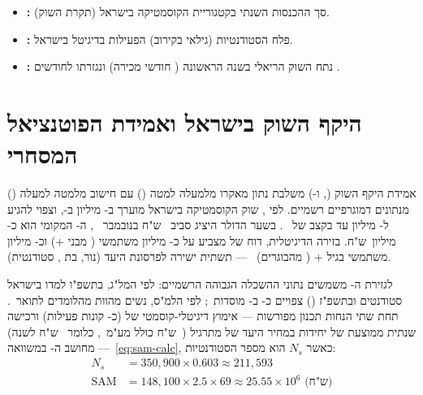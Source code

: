 \begin{definitionbox}
\begin{itemize}
  \item \textbf{:} סך ההכנסות השנתי בקטגוריית הקוסמטיקה בישראל (תקרת השוק).
  \item \textbf{:} פלח הסטודנטיות (גילאי  בקירוב) הפעילות בדיגיטל בישראל.
  \item \textbf{:} נתח השוק הריאלי בשנה הראשונה ( חודשי מכירה) ונגזרתו לחודשים .
\end{itemize}
\end{definitionbox}

\section{היקף השוק בישראל ואמידת הפוטנציאל המסחרי}
\label{sec:market-sizing}

אמידת היקף השוק (,  ו-) משלבת נתון מאקרו מלמעלה למטה
() עם חישוב מלמטה למעלה () מנתונים דמוגרפיים רשמיים.
לפי , שוק הקוסמטיקה בישראל מוערך ב- מיליון
ב-, וצפוי להגיע ל- מיליון עד  בקצב 
של ~\cite{mordor2026israel}. בשער הדולר היציג סביב ~ש"ח
בנובמבר ~\cite{boi2026rates}, ה- המקומי הוא כ-
מיליון~ש"ח. בזירה הדיגיטלית, דוח  של 
מצביע על כ- מיליון משתמשי  ( מבני +)
וכ- מיליון משתמשי  בגיל + ( מהבוגרים)~\cite{datareportal2026israel}
--- תשתית ישירה לפרסונת היעד (נור, בת , סטודנטית).

לגזירת ה- משמשים נתוני ההשכלה הגבוהה הרשמיים: לפי המל"ג, בתשפ"ו למדו
בישראל  סטודנטים ובתשפ"ז () צפויים כ-
ב- מוסדות~\cite{che2026students}; לפי הלמ"ס, נשים מהוות 
מהלומדים לתואר~\cite{cbs2024students}. תחת שתי הנחות תכנון מפורשות --- אימוץ
דיגיטלי-קוסמטי של  (כ- קונות פעילות) ורכישה שנתית ממוצעת
של  יחידות במחיר היעד של  מתרגיל  (~ש"ח כולל
 מע"מ~\cite{pwc2025israelvat}, כלומר ~ש"ח לשנה) --- מחושב
ה- במשוואה~\eqref{eq:sam-calc}, כאשר $N_s$ הוא מספר הסטודנטיות:
\begin{align}
  N_s &= 350{,}900 \times 0.603 \approx 211{,}593 \label{eq:students-calc} \\
  \text{SAM} &= 148{,}100 \times 2.5 \times 69 \approx 25.55 \times 10^6\text{ (ש"ח)}
  \label{eq:sam-calc}
\end{align}

